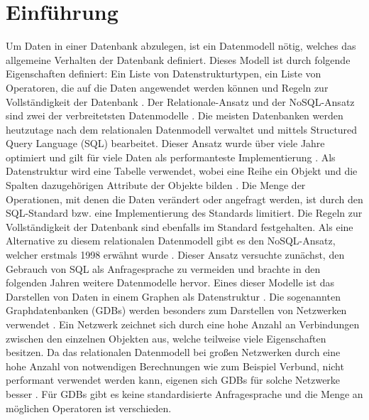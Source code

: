 
\chapter{Einführung} %

\label{Kaptiel1} %


\newcommand{\keyword}[1]{\textit{#1}}
\newcommand{\tabhead}[1]{\textbf{#1}}
\newcommand{\code}[1]{\texttt{#1}}
\newcommand{\file}[1]{\texttt{\bfseries#1}}
\newcommand{\option}[1]{\texttt{\itshape#1}}

Um Daten in einer Datenbank abzulegen, ist ein Datenmodell nötig, welches das allgemeine Verhalten der Datenbank definiert. Dieses Modell ist durch folgende Eigenschaften definiert: Ein Liste von Datenstrukturtypen, ein Liste von Operatoren, die auf die Daten angewendet werden können und Regeln zur Vollständigkeit der Datenbank \parencite{codd1981data}. Der Relationale-Ansatz und der NoSQL-Ansatz sind zwei der verbreitetsten Datenmodelle \parencite{vicknair2010comparison}. \newline
Die meisten Datenbanken werden heutzutage nach dem relationalen Datenmodell verwaltet und mittels Structured Query Language (SQL) bearbeitet. Dieser Ansatz wurde über viele Jahre optimiert und gilt für viele Daten als performanteste Implementierung \parencite{miller2013graph}. Als Datenstruktur wird eine Tabelle verwendet, wobei eine Reihe ein Objekt  und die Spalten dazugehörigen Attribute der Objekte bilden \parencite{tatarinov2002storing}. Die Menge der Operationen, mit denen die Daten verändert oder angefragt werden, ist durch den SQL-Standard bzw. eine Implementierung des Standards limitiert. Die Regeln zur Vollständigkeit der Datenbank sind ebenfalls im Standard festgehalten.  \newline 
Als eine Alternative zu diesem relationalen Datenmodell gibt es den NoSQL-Ansatz, welcher erstmals 1998 erwähnt wurde \parencite{strauch2011nosql}. Dieser Ansatz versuchte zunächst, den Gebrauch von SQL als Anfragesprache zu vermeiden und brachte in den folgenden Jahren weitere Datenmodelle hervor. Eines dieser Modelle ist das Darstellen von Daten in einem Graphen als Datenstruktur \parencite{miller2013graph}. Die sogenannten Graphdatenbanken (GDBs) werden besonders zum Darstellen von Netzwerken verwendet \parencite{han2011survey}. Ein Netzwerk zeichnet sich durch eine hohe Anzahl an Verbindungen zwischen den einzelnen Objekten aus, welche teilweise viele Eigenschaften besitzen. Da das relationalen Datenmodell bei großen Netzwerken durch eine hohe Anzahl von notwendigen Berechnungen wie zum Beispiel Verbund, nicht performant verwendet werden kann, eigenen sich GDBs für solche Netzwerke besser \parencite{miller2013graph}. Für GDBs gibt es keine standardisierte Anfragesprache und  die Menge an möglichen Operatoren ist verschieden.

